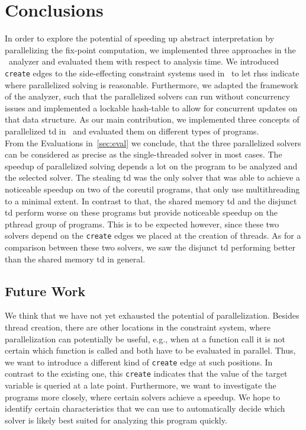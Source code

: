 \section{Conclusions}
\label{sec:conclusions}
In order to explore the potential of speeding up abstract interpretation by parallelizing the fix-point computation, we implemented three approaches in the \gob\ analyzer and evaluated them with respect to analysis time.
We introduced \texttt{create} edges to the side-effecting constraint systems used in \gob\ to let \acp{rhs} indicate where parallelized solving is reasonable. Furthermore, we adapted the framework of the analyzer, such that the parallelized solvers can run without concurrency issues and implemented a lockable hash-table to allow for concurrent updates on that data structure. As our main contribution, we implemented three concepts of parallelized \acl{td} in \gob\ and evaluated them on different types of programs.\\
From the Evaluations in~\autoref{sec:eval} we conclude, that the three parallelized solvers can be considered as precise as the single-threaded solver in most cases. The speedup of parallelized solving depends a lot on the program to be analyzed and the selected solver. The stealing \ac{td} was the only solver that was able to achieve a noticeable speedup on two of the coreutil programs, that only use multithreading to a minimal extent. In contrast to that, the shared memory \ac{td} and the disjunct \ac{td} perform worse on these programs but provide noticeable speedup on the pthread group of programs. This is to be expected however, since these two solvers depend on the \texttt{create} edges we placed at the creation of threads. As for a comparison between these two solvers, we saw the disjunct \ac{td} performing better than the shared memory \ac{td} in general.

  \label{sec:conclusions:futureWork} 
  \subsection{Future Work}
  We think that we have not yet exhausted the potential of parallelization. Besides thread creation, there are other locations in the constraint system, where parallelization can potentially be useful, e.g., when at a function call it is not certain which function is called and both have to be evaluated in parallel. Thus, we want to introduce a different kind of \texttt{create} edge at such positions. In contrast to the existing one, this \texttt{create} indicates that the value of the target variable is queried at a late point.
  Furthermore, we want to investigate the programs more closely, where certain solvers achieve a speedup. We hope to identify certain characteristics that we can use to automatically decide which solver is likely best suited for analyzing this program quickly.